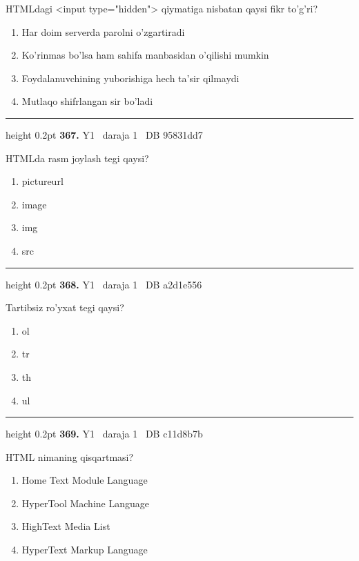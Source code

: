 \documentclass[10pt,a4paper,oneside]{article}
\begin{document}
\par
HTMLdagi \textless{}input type="hidden"\textgreater{} qiymatiga nisbatan qaysi fikr to'g'ri?
\begin{enumerate}[label=\Alph*),leftmargin=9mm]
\item Har doim serverda parolni o'zgartiradi
\item Ko'rinmas bo'lsa ham sahifa manbasidan o'qilishi mumkin
\item Foydalanuvchining yuborishiga hech ta'sir qilmaydi
\item Mutlaqo shifrlangan sir bo'ladi
\end{enumerate}
\vspace{2mm}\hrule height 0.2pt \vspace{4mm}
\hypertarget{q367}{\textbf{\color{ink}367.}}  {\color{muted}\scriptsize Y1 \textbullet\ daraja 1 \textbullet\ DB 95831dd7}
\par
HTMLda rasm joylash tegi qaysi?
\begin{enumerate}[label=\Alph*),leftmargin=9mm]
\item pictureurl
\item image
\item img
\item src
\end{enumerate}
\vspace{2mm}\hrule height 0.2pt \vspace{4mm}
\hypertarget{q368}{\textbf{\color{ink}368.}}  {\color{muted}\scriptsize Y1 \textbullet\ daraja 1 \textbullet\ DB a2d1e556}
\par
Tartibsiz ro'yxat tegi qaysi?
\begin{enumerate}[label=\Alph*),leftmargin=9mm]
\item ol
\item tr
\item th
\item ul
\end{enumerate}
\vspace{2mm}\hrule height 0.2pt \vspace{4mm}
\hypertarget{q369}{\textbf{\color{ink}369.}}  {\color{muted}\scriptsize Y1 \textbullet\ daraja 1 \textbullet\ DB c11d8b7b}
\par
HTML nimaning qisqartmasi?
\begin{enumerate}[label=\Alph*),leftmargin=9mm]
\item Home Text Module Language
\item HyperTool Machine Language
\item HighText Media List
\item HyperText Markup Language
\end{enumerate}
\end{document}
